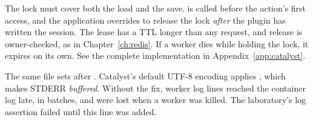 The lock must cover both the load and the save.  is called before the action's first  access, and the application overrides  to release the lock \emph{after} the plugin has written the session. The lease has a TTL longer than any request, and release is owner-checked, as in Chapter~\ref{ch:redis}. If a worker dies while holding the lock, it expires on its own.
See the complete implementation in Appendix~\ref{app:catalyst}.

The same file sets  after . Catalyst's default UTF-8 encoding applies , which makes STDERR \emph{buffered}. Without the fix, worker log lines reached the container log late, in batches, and were lost when a worker was killed. The laboratory's log assertion failed until this line was added.

